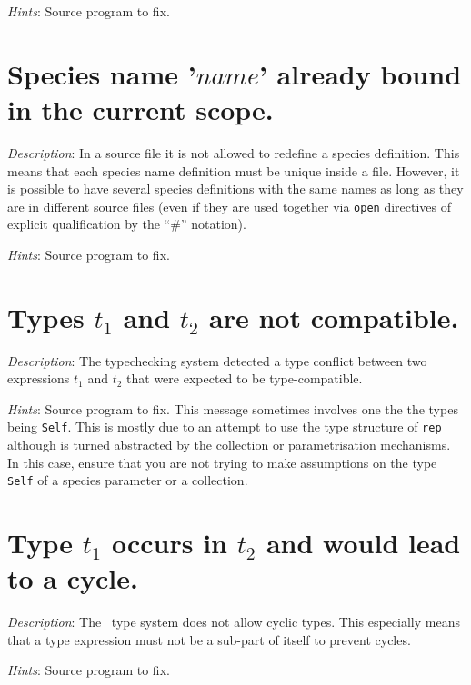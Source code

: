 {\em Hints}: Source program to fix.



\section*{Species name '$name$' already bound in the current scope.}
{\em Description}: In a source file it is not allowed to redefine a
species definition. This means that each species name definition must
be unique inside a file. However, it is possible to have several species
definitions with the same names as long as they are in different
source files (even if they are used together via {\tt open} directives
of explicit qualification by the ``\#'' notation).

{\em Hints}: Source program to fix.



\section*{Types $t_1$ and $t_2$ are not compatible.}
{\em Description}: The typechecking system detected a type conflict
between two expressions $t_1$ and $t_2$ that were expected to be
type-compatible.

{\em Hints}: Source program to fix. This message sometimes involves
one the the types being {\tt Self}. This is mostly due to an attempt
to use the type structure of {\tt rep} although is turned abstracted
by the collection or parametrisation mechanisms. In this case, ensure
that you are not trying to make assumptions on the type {\tt Self} of
a species parameter or a collection.



\section*{Type $t_1$ occurs in $t_2$ and would lead to a cycle.}
{\em Description}: The \focal\ type system does not allow cyclic
types. This especially means that a type expression must not be a
sub-part of itself to prevent cycles.

{\em Hints}: Source program to fix.



